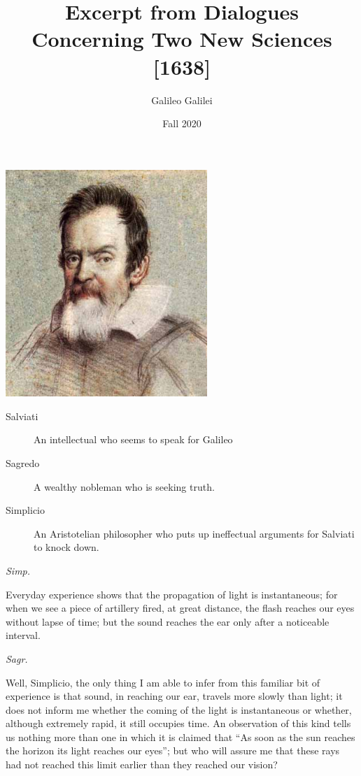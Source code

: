 \documentclass{article}
\begin{document}
\title{Excerpt from Dialogues Concerning Two New Sciences [1638]}
\author{Galileo Galilei}
\date{Fall 2020}
\maketitle

\begin{center}
\includegraphics[width=3in]{images/Galileo_9.jpeg}
\end{center}

\begin{description}
\item[Salviati] An intellectual who seems to speak for Galileo 
\item[Sagredo]  A wealthy nobleman who is seeking truth. 
\item[Simplicio]  An Aristotelian philosopher who puts up ineffectual arguments for Salviati to knock down.
\end{description}


{\em Simp.}

Everyday experience shows that the propagation of light is instantaneous; for when we see a piece of artillery fired, at great distance, the flash reaches our eyes without lapse of time; but the sound reaches the ear only after a noticeable interval.

{\em Sagr.}

Well, Simplicio, the only thing I am able to infer from this familiar bit of experience is that sound, in reaching our ear, travels more slowly than light; it does not inform me whether the coming of the light is instantaneous or whether, although extremely rapid, it still occupies time. An observation of this kind tells us nothing more than one in which it is claimed that “As soon as the sun reaches the horizon its light reaches our eyes”; but who will assure me that these rays had not reached this limit earlier than they reached our vision?
\end{document}
